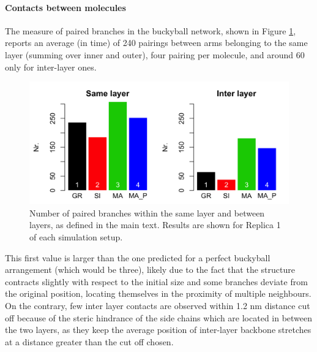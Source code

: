 \paragraph{Contacts between molecules} The measure of paired branches in the buckyball network, shown in Figure \ref{fig:BTI_beta}, reports an average (in time) of 240 pairings between arms belonging to the same layer (summing over inner and outer), four pairing per molecule, and around 60 only for inter-layer ones.
%
\begin{figure}[p]
\centering
\includegraphics[width=0.85\linewidth]{3results_capsule/pics/stAll_beta_R1.png}
\caption[Branch pairing during simulations of the buckyball]{Number of paired branches within the same layer and between layers, as defined in the main text. Results are shown for Replica 1 of each simulation setup.}
\label{fig:BTI_beta}
\end{figure}
%
This first value is larger than the one predicted for a perfect buckyball arrangement (which would be three), likely due to the fact that the structure contracts slightly with respect to the initial size and some branches deviate from the original position, locating themselves in the proximity of multiple neighbours. On the contrary, few inter layer contacts are observed within 1.2 nm distance cut off because of the steric hindrance of the side chains which are located in between the two layers, as they keep the average position of inter-layer backbone stretches at a distance greater than the cut off chosen.

